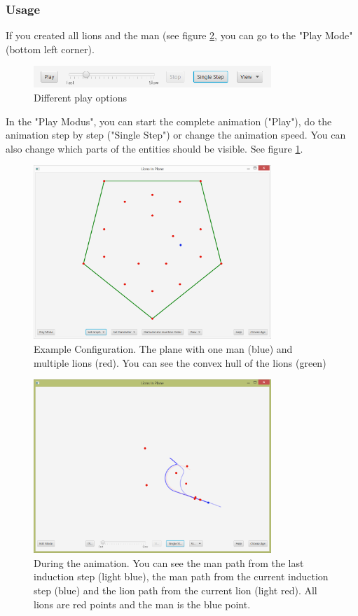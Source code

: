 \documentclass[a4paper]{article}
\begin{document}
\subsubsection*{Usage}
If you created all lions and the man (see figure \ref{fig:planeConfig}, you can go to the "Play Mode" (bottom left corner). 
\begin{figure}[hbt]
  \centering
    \includegraphics[width=0.8\textwidth]{play.PNG}
  \caption{Different play options}
  \label{fig:play}
\end{figure}
In the "Play Modus", you can start the complete animation ("Play"), do the animation step by step ("Single Step") or change the animation speed. You can also change which parts of the entities should be visible. See figure \ref{fig:play}.\\
\begin{figure}[hbt]
  \centering
    \includegraphics[width=0.8\textwidth]{planeApplet.PNG}
  \caption{Example Configuration. The plane with one man (blue) and multiple lions (red). You can see the convex hull of the lions (green)}
  \label{fig:planeConfig}
\end{figure}
\begin{figure}[hbt]
  \centering
    \includegraphics[width=0.8\textwidth]{planeAppletRun.PNG}
  \caption{During the animation. You can see the man path from the last induction step (light blue), the man path from the current induction step (blue) and the lion path from the current lion (light red). All lions are red points and the man is the blue point.}
  \label{fig:planeConfigPlay}
\end{figure}
\end{document}
